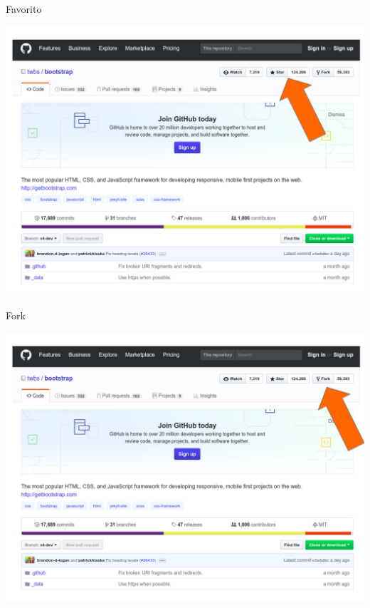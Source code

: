 \documentclass{beamer}
\begin{document}
\begin{frame}{Favorito}
  \begin{center}
       
\includegraphics[height=0.7\paperheight]{fig/aula3/favorito_projeto.png} \\
      \end{center}
 
\end{frame}
\begin{frame}{Fork}
  \begin{center}
       
\includegraphics[height=0.7\paperheight]{fig/aula3/fork_projeto.png} \\
      \end{center}
 
\end{frame}
\end{document}
